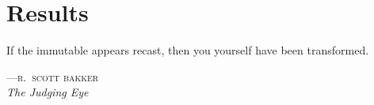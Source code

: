 %
%

\chapter{Results}

\epigraph{If the immutable appears recast, then you yourself have been 
transformed.}%
{\textsc{---r.\ scott bakker}\\\textit{The Judging Eye}}

